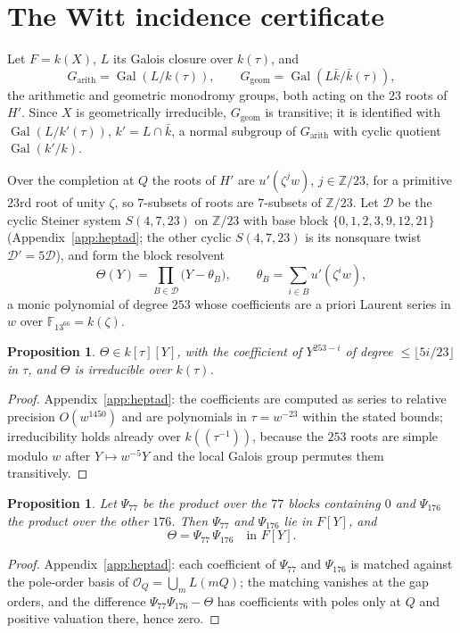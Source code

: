 \documentclass[11pt]{amsart}
\newcommand{\ZZ}{\mathbb{Z}}
\newcommand{\FF}{\mathbb{F}}
\newcommand{\Gal}{\operatorname{Gal}}
\newcommand{\Garith}{G_{\mathrm{arith}}}
\newcommand{\Ggeom}{G_{\mathrm{geom}}}
\theoremstyle{plain}
\newtheorem{proposition}[theorem]{Proposition}
\theoremstyle{definition}
\begin{document}
\section{The Witt incidence certificate}\label{sec:witt}

Let $F=k(X)$, $L$ its Galois closure over $k(\tau)$, and
\[
  \Garith=\Gal(L/k(\tau)),\qquad
  \Ggeom=\Gal(L\bar k/\bar k(\tau)) ,
\]
the arithmetic and geometric monodromy groups, both acting on the
$23$ roots of $H'$. Since $X$ is geometrically irreducible, $\Ggeom$
is transitive; it is identified with $\Gal(L/k'(\tau))$, $k'=L\cap\bar
k$, a normal subgroup of $\Garith$ with cyclic quotient $\Gal(k'/k)$.

Over the completion at $Q$ the roots of $H'$ are $u'(\zeta^jw)$,
$j\in\ZZ/23$, for a primitive $23$rd root of unity $\zeta$, so
$7$-subsets of roots are $7$-subsets of $\ZZ/23$. Let $\mathcal D$ be
the cyclic Steiner system $S(4,7,23)$ on $\ZZ/23$ with base block
$\{0,1,2,3,9,12,21\}$ (Appendix~\ref{app:heptad}; the other cyclic
$S(4,7,23)$ is its nonsquare twist $\mathcal D'=5\mathcal D$), and
form the block resolvent
\[
  \Theta(Y)=\prod_{B\in\mathcal D}\bigl(Y-\theta_B\bigr),\qquad
  \theta_B=\sum_{i\in B}u'(\zeta^iw),
\]
a monic polynomial of degree $253$ whose coefficients are a priori
Laurent series in $w$ over $\FF_{13^{66}}=k(\zeta)$.

\begin{proposition}\label{prop:theta}
$\Theta\in k[\tau][Y]$, with the coefficient of $Y^{253-i}$ of degree
$\le\lfloor5i/23\rfloor$ in $\tau$, and $\Theta$ is irreducible over
$k(\tau)$.
\end{proposition}
\begin{proof}
Appendix~\ref{app:heptad}: the coefficients are computed as series to
relative precision $O(w^{1450})$ and are polynomials in $\tau=w^{-23}$
within the stated bounds; irreducibility holds already over
$k((\tau^{-1}))$, because the $253$ roots are simple modulo $w$ after
$Y\mapsto w^{-5}Y$ and the local Galois group permutes them
transitively.
\end{proof}

\begin{proposition}\label{prop:factor}
Let $\Psi_{77}$ be the product over the $77$ blocks containing $0$ and
$\Psi_{176}$ the product over the other $176$. Then $\Psi_{77}$ and
$\Psi_{176}$ lie in $F[Y]$, and
\[
  \Theta=\Psi_{77}\,\Psi_{176}\quad\text{in }F[Y].
\]
\end{proposition}
\begin{proof}
Appendix~\ref{app:heptad}: each coefficient of $\Psi_{77}$ and
$\Psi_{176}$ is matched against the pole-order basis of
$\mathcal O_Q=\bigcup_mL(mQ)$; the matching vanishes at the gap
orders, and the difference $\Psi_{77}\Psi_{176}-\Theta$ has
coefficients with poles only at $Q$ and positive valuation there,
hence zero.
\end{proof}
\end{document}
